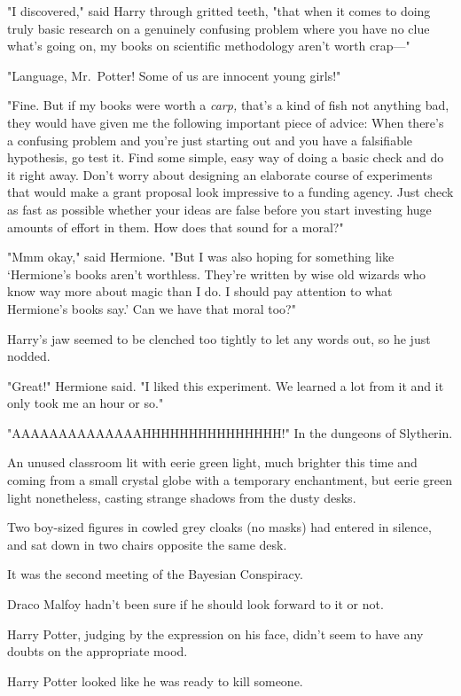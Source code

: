 "I discovered," said Harry through gritted teeth, "that when it comes to doing
truly basic research on a genuinely confusing problem where you have no clue
what's going on, my books on scientific methodology aren't worth crap—"

"Language, Mr.~Potter! Some of us are innocent young girls!"

"Fine. But if my books were worth a \emph{carp,} that's a kind of fish not
anything bad, they would have given me the following important piece of advice:
When there's a confusing problem and you're just starting out and you have a
falsifiable hypothesis, go test it. Find some simple, easy way of doing a basic
check and do it right away. Don't worry about designing an elaborate course of
experiments that would make a grant proposal look impressive to a funding
agency. Just check as fast as possible whether your ideas are false before you
start investing huge amounts of effort in them. How does that sound for a
moral?"

"Mmm{\el} okay," said Hermione. "But I was also hoping for something like
`Hermione's books aren't worthless. They're written by wise old wizards who
know way more about magic than I do. I should pay attention to what Hermione's
books say.' Can we have that moral too?"

Harry's jaw seemed to be clenched too tightly to let any words out, so he just
nodded.

"Great!" Hermione said. "I liked this experiment. We learned a lot from it and
it only took me an hour or so."

"AAAAAAAAAAAAAAHHHHHHHHHHHHHHH!"
\sbreak
In the dungeons of Slytherin.

An unused classroom lit with eerie green light, much brighter this time and
coming from a small crystal globe with a temporary enchantment, but eerie green
light nonetheless, casting strange shadows from the dusty desks.

Two boy-sized figures in cowled grey cloaks (no masks) had entered in silence,
and sat down in two chairs opposite the same desk.

It was the second meeting of the Bayesian Conspiracy.

Draco Malfoy hadn't been sure if he should look forward to it or not.

Harry Potter, judging by the expression on his face, didn't seem to have any
doubts on the appropriate mood.

Harry Potter looked like he was ready to kill someone.

